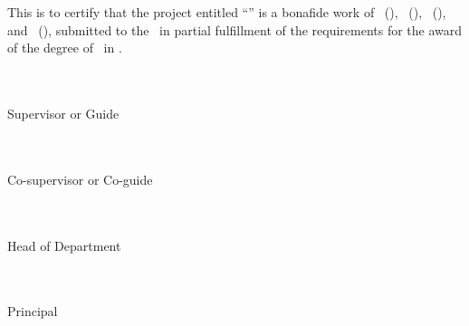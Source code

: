\ifdedication\else\thispagestyle{empty}\fi
\noindent This is to certify that the project entitled
``\ProjectTitle'' is a bonafide work of \StudentOne\ (\RollOne),
\StudentTwo\ (\RollTwo), \StudentThree\ (\RollThree), and
\StudentFour\ (\RollFour), submitted to the \UniversityName\ in
partial fulfillment of the requirements for the award of the degree of
\DegreeName\ in \ProgramName.
\vspace{28mm}
\begingroup\setlength{\parskip}{0pt}\singlespacing
\noindent\begin{minipage}[t]{.46\textwidth}\centering
\Blank[55mm]\\\GuideName\\Supervisor or Guide
\end{minipage}\hfill
\begin{minipage}[t]{.46\textwidth}\centering
\ifcoguide\Blank[55mm]\\\CoGuideName\\Co-supervisor or Co-guide\fi
\end{minipage}
\par\vspace{30mm}
\noindent\begin{minipage}[t]{.46\textwidth}\centering
\Blank[55mm]\\\HoDName\\Head of Department
\end{minipage}\hfill
\begin{minipage}[t]{.46\textwidth}\centering
\Blank[55mm]\\\PrincipalName\\Principal
\end{minipage}
\endgroup\clearpage
